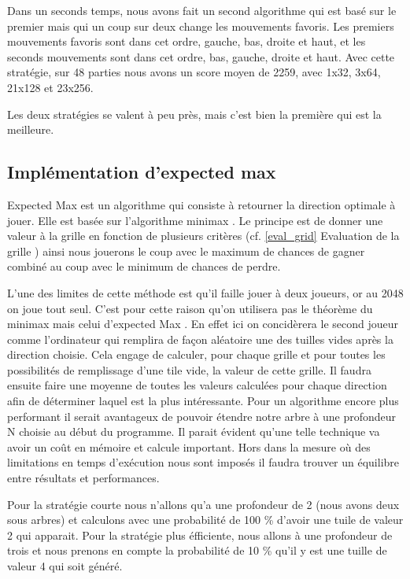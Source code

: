 \documentclass[12pt]{article}
\begin{document}
Dans un seconds temps, nous avons fait un second algorithme qui est basé sur le
premier mais qui un coup sur deux change les mouvements favoris. Les premiers
mouvements favoris sont dans cet ordre, gauche, bas, droite et haut, et les
seconds mouvements sont dans cet ordre, bas, gauche, droite et haut. Avec cette
stratégie, sur 48 parties nous avons un score moyen de 2259, avec 1x32, 3x64,
21x128 et 23x256.

Les deux stratégies se valent à peu près, mais c'est bien la première qui est la
meilleure.

\subsection{Implémentation d'expected max}
\og Expected Max \fg{} est un algorithme qui consiste \`a retourner la direction
optimale \`a jouer. Elle est bas\'ee sur l'algorithme \og minimax \fg{}. Le
principe est de donner une valeur à la grille en fonction de plusieurs critères
(cf. \og \ref{eval_grid} Evaluation de la grille \fg{}) ainsi nous jouerons le
coup avec le maximum de chances de gagner combiné au coup avec le minimum de
chances de perdre.
\par L'une des limites de cette m\'ethode est qu'il faille jouer \`a deux
joueurs, or au 2048 on joue tout seul. C'est pour cette raison qu'on utilisera pas le
th\'eor\`eme du \og minimax \fg{} mais celui d'\og expected Max \fg{}. En effet
ici on concid\`erera le second joueur comme l'ordinateur qui remplira de façon
aléatoire une des tuilles vides apr\`es la direction choisie. Cela engage de
calculer, pour chaque grille et pour toutes les possibilit\'es de remplissage
d'une tile vide, la valeur de cette grille. Il faudra ensuite faire une moyenne
de toutes les valeurs calculées pour chaque direction afin de déterminer laquel
est la plus intéressante. Pour un algorithme encore plus performant il serait
avantageux de pouvoir \'etendre notre arbre \`a une profondeur N choisie au
d\'ebut du programme. Il parait évident qu'une telle technique va avoir un coût
en mémoire et calcule important. Hors dans la mesure où des limitations en temps
d'exécution nous sont imposés il faudra trouver un équilibre entre résultats et
performances.
\par Pour la strat\'egie courte nous n'allons qu'a une profondeur de 2 (nous
avons deux sous arbres) et calculons avec une probabilit\'e de 100 \%
d'avoir une tuile de valeur 2 qui apparait. Pour la strat\'egie plus
\'efficiente, nous allons \`a une profondeur de trois et nous prenons en compte
la probabilit\'e de 10 \% qu'il y est une tuille de valeur 4 qui soit
g\'en\'er\'e.
\end{document}
